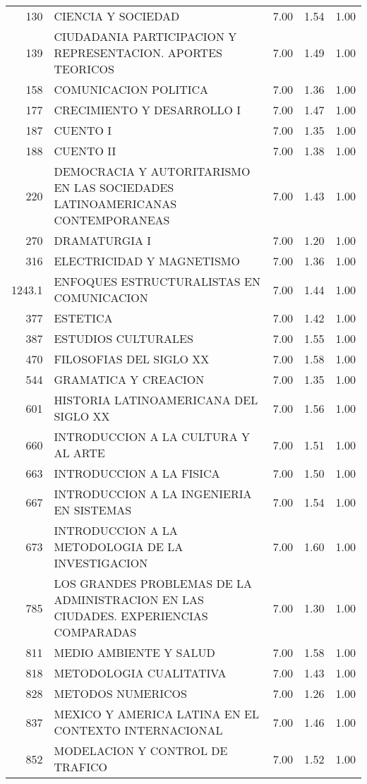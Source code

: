 \begin{table}[ht]
\begin{tabular}{rlrrr}
  130 & CIENCIA Y SOCIEDAD & 7.00 & 1.54 & 1.00 \\ 
  139 & CIUDADANIA PARTICIPACION Y REPRESENTACION. APORTES TEORICOS & 7.00 & 1.49 & 1.00 \\ 
  158 & COMUNICACION POLITICA & 7.00 & 1.36 & 1.00 \\ 
  177 & CRECIMIENTO Y DESARROLLO I & 7.00 & 1.47 & 1.00 \\ 
  187 & CUENTO I & 7.00 & 1.35 & 1.00 \\ 
  188 & CUENTO II & 7.00 & 1.38 & 1.00 \\ 
  220 & DEMOCRACIA Y AUTORITARISMO EN LAS SOCIEDADES LATINOAMERICANAS CONTEMPORANEAS & 7.00 & 1.43 & 1.00 \\ 
  270 & DRAMATURGIA I & 7.00 & 1.20 & 1.00 \\ 
  316 & ELECTRICIDAD Y MAGNETISMO & 7.00 & 1.36 & 1.00 \\ 
  1243.1 & ENFOQUES ESTRUCTURALISTAS EN COMUNICACION & 7.00 & 1.44 & 1.00 \\ 
  377 & ESTETICA & 7.00 & 1.42 & 1.00 \\ 
  387 & ESTUDIOS CULTURALES & 7.00 & 1.55 & 1.00 \\ 
  470 & FILOSOFIAS DEL SIGLO XX & 7.00 & 1.58 & 1.00 \\ 
  544 & GRAMATICA Y CREACION & 7.00 & 1.35 & 1.00 \\ 
  601 & HISTORIA LATINOAMERICANA DEL SIGLO XX & 7.00 & 1.56 & 1.00 \\ 
  660 & INTRODUCCION A LA CULTURA Y AL ARTE & 7.00 & 1.51 & 1.00 \\ 
  663 & INTRODUCCION A LA FISICA & 7.00 & 1.50 & 1.00 \\ 
  667 & INTRODUCCION A LA INGENIERIA EN SISTEMAS & 7.00 & 1.54 & 1.00 \\ 
  673 & INTRODUCCION A LA METODOLOGIA DE LA INVESTIGACION & 7.00 & 1.60 & 1.00 \\ 
  785 & LOS GRANDES PROBLEMAS DE LA ADMINISTRACION EN LAS CIUDADES. EXPERIENCIAS COMPARADAS & 7.00 & 1.30 & 1.00 \\ 
  811 & MEDIO AMBIENTE Y SALUD & 7.00 & 1.58 & 1.00 \\ 
  818 & METODOLOGIA CUALITATIVA & 7.00 & 1.43 & 1.00 \\ 
  828 & METODOS NUMERICOS & 7.00 & 1.26 & 1.00 \\ 
  837 & MEXICO Y AMERICA LATINA EN EL CONTEXTO INTERNACIONAL & 7.00 & 1.46 & 1.00 \\ 
  852 & MODELACION Y CONTROL DE TRAFICO & 7.00 & 1.52 & 1.00 \\ 

\end{tabular}
\end{table}
